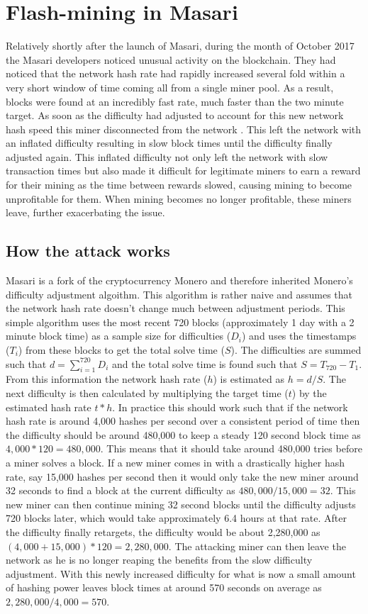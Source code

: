 \documentclass{article}
\begin{document}
\section{Flash-mining in Masari}
Relatively shortly after the launch of Masari, during the month of October 2017 the Masari developers noticed unusual activity on the blockchain. They had noticed that the network hash rate had rapidly increased several fold within a very short window of time coming all from a single miner pool. As a result, blocks were found at an incredibly fast rate, much faster than the two minute target. As soon as the difficulty had adjusted to account for this new network hash speed this miner disconnected from the network . This left the network with an inflated difficulty resulting in slow block times until the difficulty finally adjusted again. This inflated difficulty not only left the network with slow transaction times but also made it difficult for legitimate miners to earn a reward for their mining as the time between rewards slowed, causing mining to become unprofitable for them. When mining becomes no longer profitable, these miners leave, further exacerbating the issue.


\subsection{How the attack works}
Masari is a fork of the cryptocurrency Monero and therefore inherited Monero's difficulty adjustment algoithm. This algorithm is rather naive and assumes that the network hash rate doesn't change much between adjustment periods. This simple algorithm uses the most recent 720 blocks (approximately 1 day with a 2 minute block time) as a sample size for difficulties ($D_i$) and uses the timestamps ($T_i$) from these blocks to get the total solve time ($S$). The difficulties are summed such that $d = \sum_{i=1}^{720} D_{i}$ and the total solve time is found such that $S = T_{720} - T_1$. From this information the network hash rate ($h$) is estimated as $h = d / S$. The next difficulty is then calculated by multiplying the target time ($t$) by the estimated hash rate $t * h$. In practice this should work such that if the network hash rate is around 4,000 hashes per second over a consistent period of time then the difficulty should be around 480,000 to keep a steady 120 second block time as $4,000 * 120 = 480,000$. This means that it should take around 480,000 tries before a miner solves a block. If a new miner comes in with a drastically higher hash rate, say 15,000 hashes per second then it would only take the new miner around 32 seconds to find a block at the current difficulty as $480,000 / 15,000 = 32$. This new miner can then continue mining 32 second blocks until the difficulty adjusts 720 blocks later, which would take approximately 6.4 hours at that rate. After the difficulty finally retargets, the difficulty would be about 2,280,000 as $(4,000 + 15,000) * 120 = 2,280,000$. The attacking miner can then leave the network as he is no longer reaping the benefits from the slow difficulty adjustment. With this newly increased difficulty for what is now a small amount of hashing power leaves block times at around 570 seconds on average as $2,280,000 / 4,000 = 570$.
\end{document}
